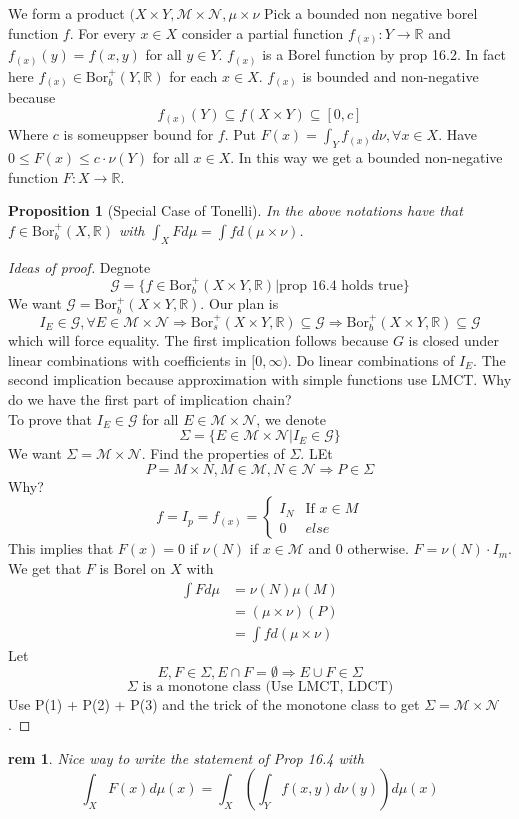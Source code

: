 \documentclass[letterpaper, 12pt]{article}
\newcommand{\fin}{\qquad \quad \hfill \framebox[1.75mm][l]{\,}}
\newcommand{\cM}{\mathcal{M}}
\newcommand{\cN}{\mathcal{N}}
\newcommand{\cG}{\mathcal{G}}
\newcommand{\bR}{\mathbb{R}}
\newcommand{\Bor}{\mathrm{Bor}}
\theoremstyle{stdthm}
\newtheorem{prop}[thm]{Proposition}
\theoremstyle{stddef}
\newtheorem{rem}[thm]{rem} %
\theoremstyle{stdnonum}
\theoremstyle{stdqands}
\theoremstyle{stdbold}
\begin{document}
 We form a product $(X \times Y, \cM \times \cN, \mu \times \nu$ Pick a bounded non negative borel function $f$. For every $x \in X$ consider a partial function $f_{(x)}: Y \to \bR$ and $f_{(x)}(y) = f(x,y)$ for all $y \in Y$. $f_{(x)}$ is a Borel function by prop 16.2. In fact here $f_{(x)} \in \Bor_b^+(Y,\bR)$ for each $x \in X$. $f_{(x)}$ is bounded and non-negative because 
 \[ f_{(x)}(Y) \subseteq f(X \times Y) \subseteq [0,c]\]
 Where $c$ is someuppser bound for $f$. Put $F(x) = \int_Y f_{(x)}d\nu, \forall x \in X$. Have $0 \leq F(x) \leq c\cdot \nu(Y)$ for all $x \in X$. In this way we get a bounded non-negative function $F:X \to \bR$. 
 
 \begin{prop} [Special Case of Tonelli]
 In the above notations have that $f \in \Bor_b^+(X,\bR)$ with $\int_X F d\mu = \int f d(\mu \times \nu)$.
 \end{prop}
 
 \begin{proof} [Ideas of proof]
 Degnote 
 \[ \cG = \{ f \in \Bor_b^+(X \times Y, \bR) | \text{prop 16.4 holds true}\} \]
 We want $\cG = \Bor_b^+(X\times Y,\bR)$. Our plan is 
 \[ I_E \in \cG, \forall E \in \cM \times \cN \Rightarrow \Bor_s^+(X\times Y, \bR) \subseteq \cG \Rightarrow \Bor_b^+(X\times Y, \bR) \subseteq \cG \]
 which will force equality. The first implication follows because $G$ is closed under linear combinations with coefficients in $[0,\infty)$. Do linear combinations of $I_E$. The second implication because approximation with simple functions use LMCT. Why do we have the first part of implication chain? \\
 
 To prove that $I_E \in \cG$ for all $E \in \cM \times \cN$, we denote 
 \[ \Sigma = \{ E \in \cM \times \cN|I_E \in \cG \}\]
 We want $\Sigma = \cM \times \cN$. Find the properties of $\Sigma$. LEt 
 \[ \tag{P1} P = M \times N, M\in \cM, N \in \cN \Rightarrow P \in \Sigma \]
 Why?
 \[f = I_p = f_{(x)} = 
 \begin{cases}
 I_N & \text{If } x \in M\\
 0 & else
 \end{cases}
 \]
 This implies that $F(x) = 0$ if $\nu(N)$ if $x \in \cM$ and 0 otherwise. $F = \nu(N)\cdot I_m$. We get that $F$ is Borel on $X$ with 
 \begin{align*}
 \int F d\mu &= \nu(N) \mu(M)\\
 &= (\mu \times \nu) (P)\\
 &= \int f d(\mu \times \nu)
 \end{align*}
 Let 
 \[ \tag{P2} E,F \in \Sigma, E \cap F = \emptyset \Rightarrow E \cup F \in \Sigma \]
 \[ \tag{P3} \Sigma \text{ is a monotone class (Use LMCT, LDCT)} \]
 Use P(1) + P(2) + P(3) and the trick of the monotone class to get $\Sigma = \cM \times \cN$. 
 \end{proof}
 \begin{rem}
 Nice way to write the statement of Prop 16.4 with 
 \[ \int_X F(x)d\mu(x) = \int_X \left( \int_Y f(x,y)d\nu(y) \right) d\mu(x) \]
 \end{rem}
 
\end{document}
